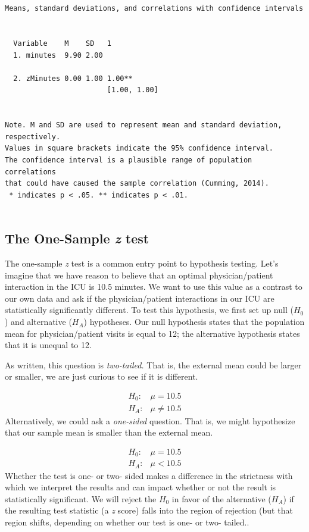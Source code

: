\documentclass[
  11pt,
]{book}
\begin{document}
\begin{verbatim}


Means, standard deviations, and correlations with confidence intervals
 

  Variable    M    SD   1           
  1. minutes  9.90 2.00             
                                    
  2. zMinutes 0.00 1.00 1.00**      
                        [1.00, 1.00]
                                    

Note. M and SD are used to represent mean and standard deviation, respectively.
Values in square brackets indicate the 95% confidence interval.
The confidence interval is a plausible range of population correlations 
that could have caused the sample correlation (Cumming, 2014).
 * indicates p < .05. ** indicates p < .01.
 
\end{verbatim}

\hypertarget{the-one-sample-z-test}{%
\subsection{\texorpdfstring{The One-Sample \emph{z} test}{The One-Sample z test}}\label{the-one-sample-z-test}}

The one-sample \emph{z} test is a common entry point to hypothesis testing. Let's imagine that we have reason to believe that an optimal physician/patient interaction in the ICU is 10.5 minutes. We want to use this value as a contrast to our own data and ask if the physician/patient interactions in our ICU are statistically significantly different. To test this hypothesis, we first set up null (\(H_0\)) and alternative (\(H_A\)) hypotheses. Our null hypothesis states that the population mean for physician/patient visits is equal to 12; the alternative hypothesis states that it is unequal to 12.

As written, this question is \emph{two-tailed.} That is, the external mean could be larger or smaller, we are just curious to see if it is different.

\[
\begin{array}{ll}
H_0: & \mu = 10.5 \\
H_A: & \mu \neq 10.5
\end{array}
\]
Alternatively, we could ask a \emph{one-sided} question. That is, we might hypothesize that our sample mean is smaller than the external mean.

\[
\begin{array}{ll}
H_0: & \mu = 10.5 \\
H_A: & \mu < 10.5
\end{array}
\]
Whether the test is one- or two- sided makes a difference in the strictness with which we interpret the results and can impact whether or not the result is statistically significant. We will reject the \(H_0\) in favor of the alternative (\(H_A\)) if the resulting test statistic (a \emph{z} score) falls into the region of rejection (but that region shifts, depending on whether our test is one- or two- tailed..
\end{document}
